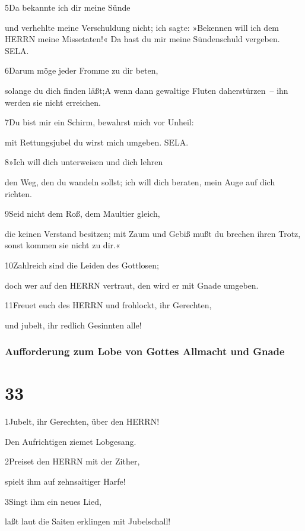 5Da bekannte ich dir meine Sünde

und verhehlte meine Verschuldung nicht; ich sagte: »Bekennen will ich
dem HERRN meine Missetaten!« Da hast du mir meine Sündenschuld vergeben.
SELA.

6Darum möge jeder Fromme zu dir beten,

solange du dich finden läßt;{A} wenn dann gewaltige Fluten
daherstürzen~-- ihn werden sie nicht erreichen.

7Du bist mir ein Schirm, bewahrst mich vor Unheil:

mit Rettungsjubel du wirst mich umgeben. SELA.

8»Ich will dich unterweisen und dich lehren

den Weg, den du wandeln sollst; ich will dich beraten, mein Auge auf
dich richten.

9Seid nicht dem Roß, dem Maultier gleich,

die keinen Verstand besitzen; mit Zaum und Gebiß mußt du brechen ihren
Trotz, sonst kommen sie nicht zu dir.«

10Zahlreich sind die Leiden des Gottlosen;

doch wer auf den HERRN vertraut, den wird er mit Gnade umgeben.

11Freuet euch des HERRN und frohlockt, ihr Gerechten,

und jubelt, ihr redlich Gesinnten alle!

\hypertarget{aufforderung-zum-lobe-von-gottes-allmacht-und-gnade}{%
\subsubsection{Aufforderung zum Lobe von Gottes Allmacht und
Gnade}\label{aufforderung-zum-lobe-von-gottes-allmacht-und-gnade}}

\hypertarget{section-32}{%
\section{33}\label{section-32}}

1Jubelt, ihr Gerechten, über den HERRN!

Den Aufrichtigen ziemet Lobgesang.

2Preiset den HERRN mit der Zither,

spielt ihm auf zehnsaitiger Harfe!

3Singt ihm ein neues Lied,

laßt laut die Saiten erklingen mit Jubelschall!

